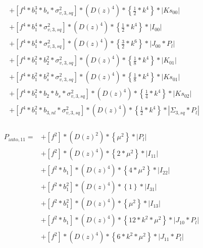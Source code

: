 \documentclass{article}
\begin{document}
\begin{equation}
\begin{aligned}
&+\left[f^{4}*b_{1}^{3}*b_{s}*\sigma_{v,3,sq}^{2}\right]*\left(D(z)^{4}\right)*\left\{\frac{1}{2}*k^{4}\right\}*\left|Ks_{00}\right| \\
&+\left[f^{4}*b_{1}^{4}*\sigma_{v,3,sq}^{2}\right]*\left(D(z)^{4}\right)*\left\{\frac{1}{2}*k^{4}\right\}*\left|I_{00}\right| \\
&+\left[f^{4}*b_{1}^{4}*\sigma_{v,3,sq}^{2}\right]*\left(D(z)^{4}\right)*\left\{\frac{3}{2}*k^{6}\right\}*\left|J_{00}*P_l\right| \\
&+\left[f^{4}*b_{1}^{2}*b_{2}^{2}*\sigma_{v,3,sq}^{2}\right]*\left(D(z)^{4}\right)*\left\{\frac{1}{8}*k^{4}\right\}*\left|K_{01}\right| \\
&+\left[f^{4}*b_{1}^{2}*b_{s}^{2}*\sigma_{v,3,sq}^{2}\right]*\left(D(z)^{4}\right)*\left\{\frac{1}{8}*k^{4}\right\}*\left|Ks_{01}\right| \\
&+\left[f^{4}*b_{1}^{2}*b_{2}*b_{s}*\sigma_{v,3,sq}^{2}\right]*\left(D(z)^{4}\right)*\left\{\frac{1}{4}*k^{4}\right\}*\left|Ks_{02}\right| \\
&+\left[f^{4}*b_{1}^{2}*b_{3,nl}*\sigma_{v,3,sq}^{2}\right]*\left(D(z)^{4}\right)*\left\{\frac{1}{2}*k^{4}\right\}*\left|\Sigma_{3,sq}*P_l\right| \\
\end{aligned}
\end{equation}


\begin{equation}
\begin{aligned}  
P_{\mathrm{auto},11}=
&+\left[f^{2}\right]*\left(D(z)^{2}\right)*\left\{\mu^{2}\right\}*\left|P_l\right| \\
&+\left[f^{2}\right]*\left(D(z)^{4}\right)*\left\{2*\mu^{2}\right\}*\left|I_{11}\right| \\
&+\left[f^{2}*b_{1}\right]*\left(D(z)^{4}\right)*\left\{4*\mu^{2}\right\}*\left|I_{22}\right| \\
&+\left[f^{2}*b_{1}^{2}\right]*\left(D(z)^{4}\right)*\left\{1\right\}*\left|I_{31}\right| \\
&+\left[f^{2}*b_{1}^{2}\right]*\left(D(z)^{4}\right)*\left\{\mu^{2}\right\}*\left|I_{13}\right| \\
&+\left[f^{2}*b_{1}\right]*\left(D(z)^{4}\right)*\left\{12*k^{2}*\mu^{2}\right\}*\left|J_{10}*P_l\right| \\
&+\left[f^{2}\right]*\left(D(z)^{4}\right)*\left\{6*k^{2}*\mu^{2}\right\}*\left|J_{11}*P_l\right| \\
\end{aligned}
\end{equation}
\end{document}
